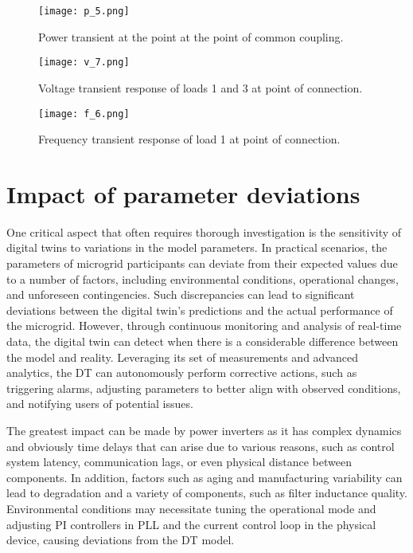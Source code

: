 \begin{figure}[htbp]
    \centering
    \texttt{[image: p\_5.png]}
    \caption{Power transient at the point at the point of common coupling.}
    \label{fig:p_response}
\end{figure}
\begin{figure}[htbp]
    \centering
    \texttt{[image: v\_7.png]}
    \caption{Voltage transient response of loads 1 and 3 at point of connection.}
    \label{fig:v_response}
\end{figure}
\begin{figure}[htbp]
    \centering
    \texttt{[image: f\_6.png]}
    \caption{Frequency transient response of load 1 at point of connection.}
    \label{fig:f_response}
\end{figure}

\section{Impact of parameter deviations}\label{sec:ch4/sec4}
One critical aspect that often requires thorough investigation is the sensitivity of digital twins to variations in the model parameters. In practical scenarios, the parameters of microgrid participants can deviate from their expected values due to a number of factors, including environmental conditions, operational changes, and unforeseen contingencies. Such discrepancies can lead to significant deviations between the digital twin's predictions and the actual performance of the microgrid. However, through continuous monitoring and analysis of real-time data, the digital twin can detect when there is a considerable difference between the model and reality. Leveraging its set of measurements and advanced analytics, the DT can autonomously perform corrective actions, such as triggering alarms, adjusting parameters to better align with observed conditions, and notifying users of potential issues. 

The greatest impact can be made by power inverters as it has complex dynamics and obviously time delays that can arise due to various reasons, such as control system latency, communication lags, or even physical distance between components. In addition, factors such as aging and manufacturing variability can lead to degradation and a variety of components, such as filter inductance quality. Environmental conditions may necessitate tuning the operational mode and adjusting PI controllers in PLL and the current control loop in the physical device, causing deviations from the DT model.

